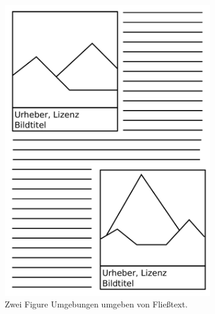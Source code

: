 \begin{figure}[ht]
  \begin{subfigure}[b]{\columnwidth/2}
    \includegraphics[width=\columnwidth]{images/figure-example.pdf}
    \caption{Zwei Figure Umgebungen umgeben von Fließtext.}
    \label{fig:image-rendering-figure}
  \end{subfigure}
  \begin{subfigure}[b]{\columnwidth/2}

\end{subfigure}
\end{figure}
